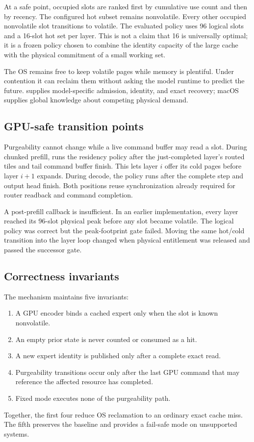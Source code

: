 At a safe point, occupied slots are ranked first by cumulative use count and
then by recency. The configured hot subset remains nonvolatile. Every other
occupied nonvolatile slot transitions to volatile. The evaluated policy uses 96
logical slots and a 16-slot hot set per layer. This is not a claim that 16 is
universally optimal; it is a frozen policy chosen to combine the identity
capacity of the large cache with the physical commitment of a small working
set.

The OS remains free to keep volatile pages while memory is plentiful. Under
contention it can reclaim them without asking the model runtime to predict the
future. \system supplies model-specific admission, identity, and exact recovery;
macOS supplies global knowledge about competing physical demand.

\subsection{GPU-safe transition points}

Purgeability cannot change while a live command buffer may read a slot. During
chunked prefill, \system runs the residency policy after the just-completed
layer's routed tiles and tail command buffer finish. This lets layer $i$ offer
its cold pages before layer $i+1$ expands. During decode, the policy runs after
the complete step and output head finish. Both positions reuse synchronization
already required for router readback and command completion.

A post-prefill callback is insufficient. In an earlier implementation, every
layer reached its 96-slot physical peak before any slot became volatile. The
logical policy was correct but the peak-footprint gate failed. Moving the same
hot/cold transition into the layer loop changed when physical entitlement was
released and passed the successor gate.

\subsection{Correctness invariants}

The mechanism maintains five invariants:

\begin{enumerate}
  \item A GPU encoder binds a cached expert only when the slot is known
  nonvolatile.
  \item An empty prior state is never counted or consumed as a hit.
  \item A new expert identity is published only after a complete exact read.
  \item Purgeability transitions occur only after the last GPU command that may
  reference the affected resource has completed.
  \item Fixed mode executes none of the purgeability path.
\end{enumerate}

Together, the first four reduce OS reclamation to an ordinary exact cache miss.
The fifth preserves the baseline and provides a fail-safe mode on unsupported
systems.
